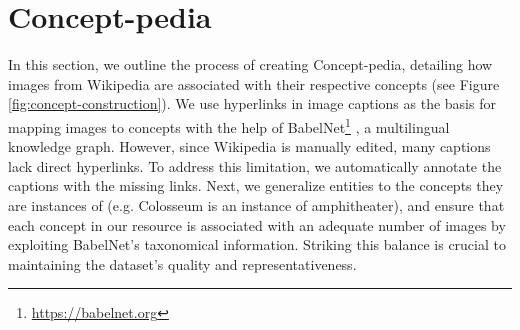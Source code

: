 \documentclass[11pt]{article}
\newcommand{\resource}{Concept-pedia}
\begin{document}
\section{Concept-pedia}
In this section, we outline the process of creating \resource, detailing how images from Wikipedia are associated with their respective concepts (see Figure \ref{fig:concept-construction}). We use hyperlinks in image captions as the basis for mapping images to concepts with the help of BabelNet\footnote{\url{https://babelnet.org}} \cite{navigli-ponzetto-2010-babelnet, navigli2021ten}, a multilingual knowledge graph. 
However, since Wikipedia is manually edited, many captions lack direct hyperlinks. 
To address this limitation, we automatically annotate the captions with the missing links. 
Next, we generalize entities to the concepts they are instances of (e.g. Colosseum is an instance of amphitheater), and ensure that each concept in our resource is associated with an adequate number of images by exploiting BabelNet's taxonomical information. 
Striking this balance is crucial to maintaining the dataset’s quality and representativeness.
\end{document}
